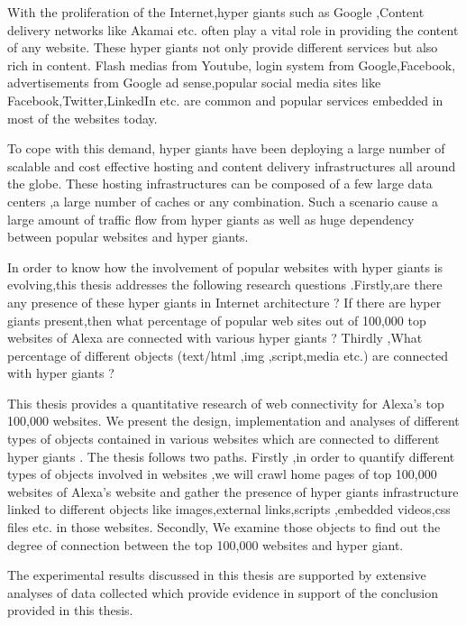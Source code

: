 With the proliferation of the Internet,hyper giants such as Google ,Content delivery networks like Akamai etc. often play a vital role in providing the content of any website. These hyper giants not only provide different services but also rich in content. Flash medias from Youtube, login system from Google,Facebook, advertisements from Google ad sense,popular social media sites like Facebook,Twitter,LinkedIn etc. are common and popular services embedded in most of the websites today. 

To cope with this demand, hyper giants have been deploying a large number of scalable and cost effective hosting and content delivery infrastructures all around the globe. These hosting infrastructures can be composed of a few large data centers ,a large number of caches or any combination. Such a scenario cause a large amount of traffic flow from hyper giants as well as huge dependency between popular websites and hyper giants.

In order to know how the involvement of popular websites with hyper giants is evolving,this thesis addresses the following research questions .Firstly,are there any presence of these hyper giants in Internet architecture ? If there are hyper giants present,then what percentage of popular web sites out of 100,000 top websites of Alexa are connected with various hyper giants ? Thirdly ,What percentage of different objects (text/html ,img ,script,media etc.) are connected with hyper giants ?

This thesis provides a quantitative research of web connectivity for Alexa's top 100,000 websites. We present the design, implementation and analyses of different types of objects contained in various websites which are connected to different hyper giants . The thesis follows two paths. Firstly ,in order to quantify different types of objects involved in websites ,we will crawl home pages of top 100,000 websites of Alexa's website and gather the presence of hyper giants infrastructure linked to different objects like images,external links,scripts ,embedded videos,css files etc. in those websites. Secondly, We examine those objects to find out the degree of connection between the top 100,000 websites and hyper giant.

The experimental results discussed in this thesis are supported by extensive analyses of data collected which provide evidence in support of the conclusion provided in this thesis.
